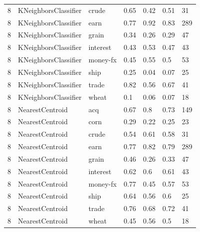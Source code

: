 \documentclass{article}
\begin{document}
\begin{table}[h]
\begin{tabular}{lllllll}
8             & KNeighborsClassifier   & crude           & 0.65               & 0.42            & 0.51              & 31               \\
8             & KNeighborsClassifier   & earn            & 0.77               & 0.92            & 0.83              & 289              \\
8             & KNeighborsClassifier   & grain           & 0.34               & 0.26            & 0.29              & 47               \\
8             & KNeighborsClassifier   & interest        & 0.43               & 0.53            & 0.47              & 43               \\
8             & KNeighborsClassifier   & money-fx        & 0.45               & 0.55            & 0.5               & 53               \\
8             & KNeighborsClassifier   & ship            & 0.25               & 0.04            & 0.07              & 25               \\
8             & KNeighborsClassifier   & trade           & 0.82               & 0.56            & 0.67              & 41               \\
8             & KNeighborsClassifier   & wheat           & 0.1                & 0.06            & 0.07              & 18               \\
8             & NearestCentroid        & acq             & 0.67               & 0.8             & 0.73              & 149              \\
8             & NearestCentroid        & corn            & 0.29               & 0.22            & 0.25              & 23               \\
8             & NearestCentroid        & crude           & 0.54               & 0.61            & 0.58              & 31               \\
8             & NearestCentroid        & earn            & 0.77               & 0.82            & 0.79              & 289              \\
8             & NearestCentroid        & grain           & 0.46               & 0.26            & 0.33              & 47               \\
8             & NearestCentroid        & interest        & 0.62               & 0.6             & 0.61              & 43               \\
8             & NearestCentroid        & money-fx        & 0.77               & 0.45            & 0.57              & 53               \\
8             & NearestCentroid        & ship            & 0.64               & 0.56            & 0.6               & 25               \\
8             & NearestCentroid        & trade           & 0.76               & 0.68            & 0.72              & 41               \\
8             & NearestCentroid        & wheat           & 0.45               & 0.56            & 0.5               & 18               \\\end{tabular}
\end{table}
\end{document}
